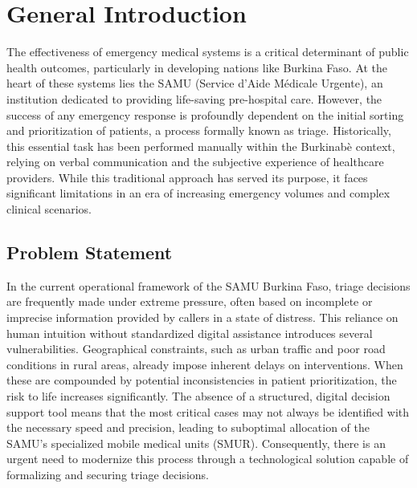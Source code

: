 \chapter*{General Introduction}
\thispagestyle{fancy}
\justifying

The effectiveness of emergency medical systems is a critical determinant of public health outcomes, particularly in developing nations like Burkina Faso. At the heart of these systems lies the SAMU (Service d'Aide M\'edicale Urgente), an institution dedicated to providing life-saving pre-hospital care. However, the success of any emergency response is profoundly dependent on the initial sorting and prioritization of patients, a process formally known as triage. Historically, this essential task has been performed manually within the Burkinab\`e context, relying on verbal communication and the subjective experience of healthcare providers. While this traditional approach has served its purpose, it faces significant limitations in an era of increasing emergency volumes and complex clinical scenarios.

\section*{Problem Statement}
In the current operational framework of the SAMU Burkina Faso, triage decisions are frequently made under extreme pressure, often based on incomplete or imprecise information provided by callers in a state of distress. This reliance on human intuition without standardized digital assistance introduces several vulnerabilities. Geographical constraints, such as urban traffic and poor road conditions in rural areas, already impose inherent delays on interventions. When these are compounded by potential inconsistencies in patient prioritization, the risk to life increases significantly. The absence of a structured, digital decision support tool means that the most critical cases may not always be identified with the necessary speed and precision, leading to suboptimal allocation of the SAMU's specialized mobile medical units (SMUR). Consequently, there is an urgent need to modernize this process through a technological solution capable of formalizing and securing triage decisions.

